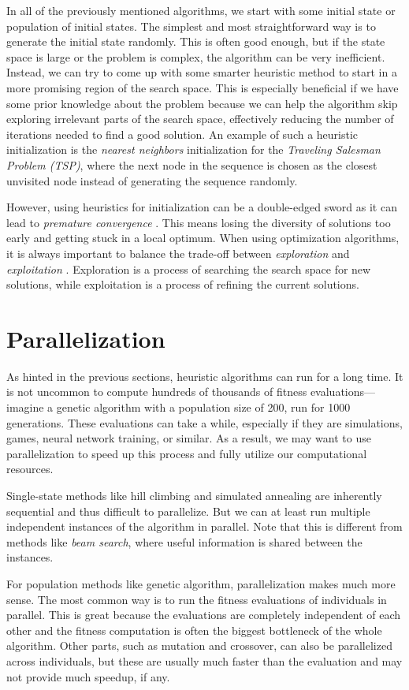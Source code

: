 In all of the previously mentioned algorithms, we start with some initial state or population of initial states. The simplest and most straightforward way is to generate the initial state randomly. This is often good enough, but if the state space is large or the problem is complex, the algorithm can be very inefficient. Instead, we can try to come up with some smarter heuristic method to start in a more promising region of the search space. This is especially beneficial if we have some prior knowledge about the problem because we can help the algorithm skip exploring irrelevant parts of the search space, effectively reducing the number of iterations needed to find a good solution. An example of such a heuristic initialization is the \textit{nearest neighbors} initialization for the \textit{Traveling Salesman Problem (TSP)}, where the next node in the sequence is chosen as the closest unvisited node instead of generating the sequence randomly.

However, using heuristics for initialization can be a double-edged sword as it can lead to \textit{premature convergence} \cite{vanneschi2023lectures}. This means losing the diversity of solutions too early and getting stuck in a local optimum.
When using optimization algorithms, it is always important to balance the trade-off between \textit{exploration} and \textit{exploitation} \cite{luke2013essentials}. Exploration is a process of searching the search space for new solutions, while exploitation is a process of refining the current solutions.

\section{Parallelization} \label{sec:parallelization}

As hinted in the previous sections, heuristic algorithms can run for a long time. It is not uncommon to compute hundreds of thousands of fitness evaluations---imagine a genetic algorithm with a population size of 200, run for 1000 generations. These evaluations can take a while, especially if they are simulations, games, neural network training, or similar. As a result, we may want to use parallelization to speed up this process and fully utilize our computational resources.

Single-state methods like hill climbing and simulated annealing are inherently sequential and thus difficult to parallelize. But we can at least run multiple independent instances of the algorithm in parallel. Note that this is different from methods like \textit{beam search}, where useful information is shared between the instances.

For population methods like genetic algorithm, parallelization makes much more sense. The most common way is to run the fitness evaluations of individuals in parallel. This is great because the evaluations are completely independent of each other and the fitness computation is often the biggest bottleneck of the whole algorithm. Other parts, such as mutation and crossover, can also be parallelized across individuals, but these are usually much faster than the evaluation and may not provide much speedup, if any.
